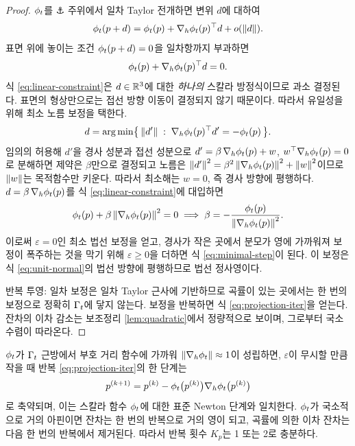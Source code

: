 \begin{proof}
$\phi_t$를 $\anchor$ 주위에서 일차 Taylor 전개하면 변위 $d$에 대하여
\begin{equation}
  \phi_t(p+d) = \phi_t(p) + \nabla_h\phi_t(p)^{\top} d + o(\left\lVert d \right\rVert).
  \label{eq:taylor}
\end{equation}
표면 위에 놓이는 조건 $\phi_t(p+d)=0$을 일차항까지 부과하면
\begin{equation}
  \phi_t(p) + \nabla_h\phi_t(p)^{\top} d = 0.
  \label{eq:linear-constraint}
\end{equation}
식 \eqref{eq:linear-constraint}은 $d\in\mathbb{R}^3$에 대한 \emph{하나의} 스칼라 방정식이므로
과소 결정된다. 표면의 형상만으로는 접선 방향 이동이 결정되지 않기 때문이다. 따라서
유일성을 위해 최소 노름 보정을 택한다.
\begin{equation}
  d = \operatorname*{arg\,min}\bigl\{\,\left\lVert d' \right\rVert \;:\; \nabla_h\phi_t(p)^{\top} d' = -\phi_t(p) \,\bigr\}.
  \label{eq:least-norm}
\end{equation}
임의의 허용해 $d'$을 경사 성분과 접선 성분으로
$d' = \beta\,\nabla_h\phi_t(p) + w$, $w^{\top}\nabla_h\phi_t(p)=0$로 분해하면
제약은 $\beta$만으로 결정되고 노름은
$\left\lVert d' \right\rVert^2 = \beta^2\left\lVert \nabla_h\phi_t(p) \right\rVert^2 + \left\lVert w \right\rVert^2$이므로 $\left\lVert w \right\rVert$는
목적함수만 키운다. 따라서 최소해는 $w=0$, 즉 경사 방향에 평행하다.
$d=\beta\,\nabla_h\phi_t(p)$를 식 \eqref{eq:linear-constraint}에 대입하면
\[
  \phi_t(p) + \beta\left\lVert \nabla_h\phi_t(p) \right\rVert^2 = 0
  \;\Longrightarrow\;
  \beta = -\frac{\phi_t(p)}{\left\lVert \nabla_h\phi_t(p) \right\rVert^2}.
\]
이로써 $\varepsilon=0$인 최소 법선 보정을 얻고, 경사가 작은 곳에서 분모가 영에
가까워져 보정이 폭주하는 것을 막기 위해 $\varepsilon\ge0$을 더하면 식
\eqref{eq:minimal-step}이 된다. 이 보정은 식 \eqref{eq:unit-normal}의 법선 방향에
평행하므로 법선 정사영이다.

반복 투영: 일차 보정은 일차 Taylor 근사에 기반하므로 곡률이 있는 곳에서는 한 번의
보정으로 정확히 $\Gamma_t$에 닿지 않는다. 보정을 반복하면 식
\eqref{eq:projection-iter}을 얻는다. 잔차의 이차 감소는 보조정리
\ref{lem:quadratic}에서 정량적으로 보이며, 그로부터 국소 수렴이 따라온다.
\end{proof}

\begin{proposition}[부호 거리 근방에서의 1--2회 수렴]
\label{prop:newton-steps}
$\phi_t$가 $\Gamma_t$ 근방에서 부호 거리 함수에 가까워 $\left\lVert \nabla_h\phi_t \right\rVert\approx1$이
성립하면, $\varepsilon$이 무시할 만큼 작을 때 반복 \eqref{eq:projection-iter}의 한
단계는
\begin{equation}
  p^{(k+1)} = p^{(k)} - \phi_t\bigl(p^{(k)}\bigr)\nabla_h\phi_t\bigl(p^{(k)}\bigr)
  \label{eq:newton-step}
\end{equation}
로 축약되며, 이는 스칼라 함수 $\phi_t$에 대한 표준 Newton 단계와 일치한다. $\phi_t$가
국소적으로 거의 아핀이면 잔차는 한 번의 반복으로 거의 영이 되고, 곡률에 의한 이차
잔차는 다음 한 번의 반복에서 제거된다. 따라서 반복 횟수 $K_p$는 1 또는 2로 충분하다.
\end{proposition}

